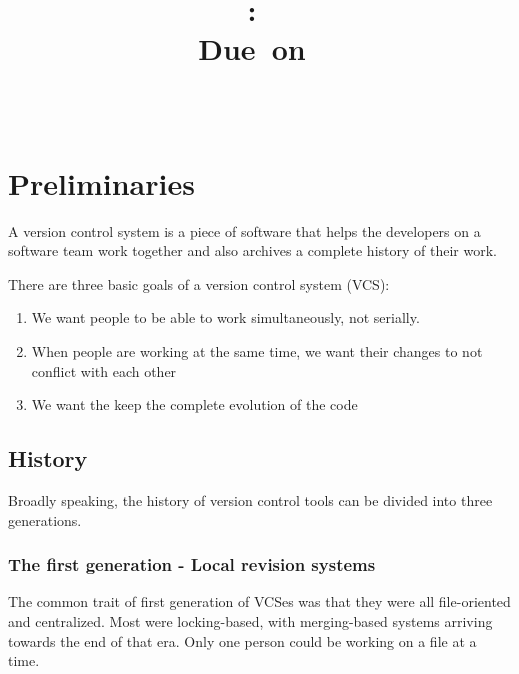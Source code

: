 \documentclass{article}
\title{
\vspace{2in}
\textmd{\textbf{\hmwkClass:\ \hmwkTitle}}\\
\normalsize\vspace{0.1in}\small{Due\ on\ \hmwkDueDate}\\
\vspace{0.1in}\large{\textit{\hmwkClassInstructor\ \hmwkClassTime}}
\vspace{3in}
}
\author{\textbf{\hmwkAuthorName}}
\date{} %
\begin{document}
\maketitle



\newpage
\tableofcontents
\newpage




 \section{Preliminaries}

A version control system is a piece of software that helps the
developers on a software team work together and also archives a
complete history of their work.

There are three basic goals of a version control system (VCS):

\begin{enumerate}
\item We want people to be able to work simultaneously, not serially.
\item When people are working at the same time, we want their changes
  to not conflict with each other
\item We want the keep the complete evolution of the code
\end{enumerate}

\subsection*{History}
Broadly speaking, the history of version control tools can be divided
into three generations.

\subsubsection*{The first generation - Local revision systems}

The common trait of first generation of VCSes was that they were all
file-oriented and centralized. Most were locking-based, with
merging-based systems arriving towards the end of that era. Only one
person could be working on a file at a time. 
\end{document}
